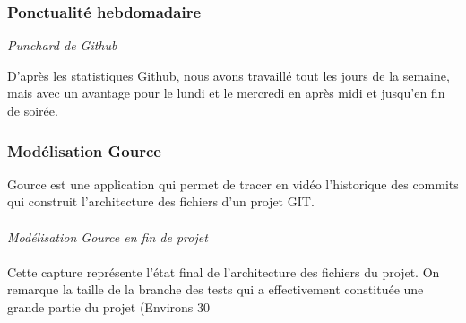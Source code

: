 \subsubsection{Ponctualité hebdomadaire}

\noindent
{}
\begin{center}
\textit{Punchard de Github}
\end{center}

D’après les statistiques Github, nous avons travaillé tout les jours de la semaine, mais avec un avantage pour le lundi et le mercredi en après midi et jusqu’en fin de soirée.

\subsubsection{Modélisation Gource}

Gource est une application qui permet de tracer en vidéo l’historique des commits qui construit l’architecture des fichiers d’un projet GIT.

\paragraph{}
\noindent
{}
\begin{center}
\textit{Modélisation Gource en fin de projet}
\end{center}

\paragraph{}
Cette capture représente l’état final de l’architecture des fichiers du projet. On remarque la taille de la branche des tests qui a effectivement constituée une grande partie du projet (Environs 30%
